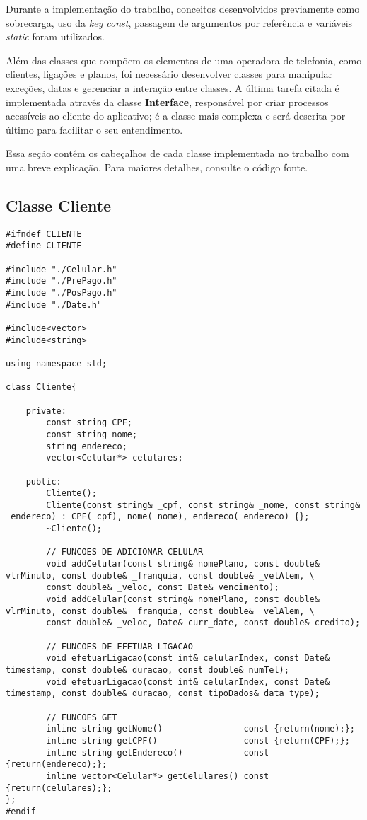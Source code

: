 Durante a implementação do trabalho, conceitos desenvolvidos previamente como sobrecarga, uso da \textit{key const}, passagem de argumentos por referência e variáveis \textit{static} foram utilizados.

Além das classes que compõem os elementos de uma operadora de telefonia, como clientes, ligações e planos, foi necessário desenvolver classes para manipular exceções, datas e gerenciar a interação entre classes. A última tarefa citada é implementada através da classe \textbf{Interface}, responsável por criar processos acessíveis ao cliente do aplicativo; é a classe mais complexa e será descrita por último para facilitar o seu entendimento.

Essa seção contém os cabeçalhos de cada classe implementada no trabalho com uma breve explicação. Para maiores detalhes, consulte o código fonte.

\pagebreak

\subsection{Classe Cliente} \label{sec:cliente}

\begin{lstlisting}[basicstyle=\tiny]
#ifndef CLIENTE
#define CLIENTE

#include "./Celular.h"
#include "./PrePago.h"
#include "./PosPago.h"
#include "./Date.h"

#include<vector>
#include<string>

using namespace std;

class Cliente{

	private:
		const string CPF;
		const string nome;
		string endereco;
		vector<Celular*> celulares;
	
	public:
		Cliente();
		Cliente(const string& _cpf, const string& _nome, const string& _endereco) : CPF(_cpf), nome(_nome), endereco(_endereco) {};
		~Cliente();
		
		// FUNCOES DE ADICIONAR CELULAR
		void addCelular(const string& nomePlano, const double& vlrMinuto, const double& _franquia, const double& _velAlem, \
		const double& _veloc, const Date& vencimento);
		void addCelular(const string& nomePlano, const double& vlrMinuto, const double& _franquia, const double& _velAlem, \
		const double& _veloc, Date& curr_date, const double& credito);
		
		// FUNCOES DE EFETUAR LIGACAO
		void efetuarLigacao(const int& celularIndex, const Date& timestamp, const double& duracao, const double& numTel);
		void efetuarLigacao(const int& celularIndex, const Date& timestamp, const double& duracao, const tipoDados& data_type);
		
		// FUNCOES GET
		inline string getNome()                const {return(nome);};
		inline string getCPF()                 const {return(CPF);};
		inline string getEndereco()            const {return(endereco);};
		inline vector<Celular*> getCelulares() const {return(celulares);};
};
#endif
\end{lstlisting}

